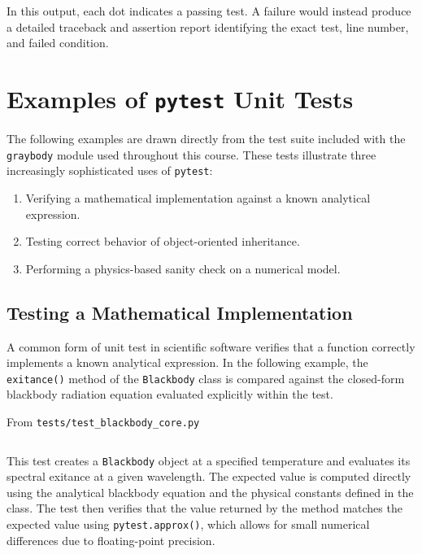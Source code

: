 In this output, each dot indicates a passing test. A failure would instead produce a detailed traceback and assertion report identifying the exact test, line number, and failed condition.

\section{Examples of \texttt{pytest} Unit Tests}

The following examples are drawn directly from the test suite included with the \texttt{graybody} module used throughout this course. These tests illustrate three increasingly sophisticated uses of \texttt{pytest}:

\begin{enumerate}
\item Verifying a mathematical implementation against a known analytical expression.
\item Testing correct behavior of object-oriented inheritance.
\item Performing a physics-based sanity check on a numerical model.
\end{enumerate}

\subsection{Testing a Mathematical Implementation}

A common form of unit test in scientific software verifies that a function correctly implements a known analytical expression. In the following example, the \texttt{exitance()} method of the \texttt{Blackbody} class is compared against the closed-form blackbody radiation equation evaluated explicitly within the test.

\vspace{0.5em}

From \texttt{tests/test\_blackbody\_core.py}
\inputminted[firstline=70,lastline=75]{python}{code/graybody/tests/test_blackbody_core.py}

\vspace{0.5em}

This test creates a \texttt{Blackbody} object at a specified temperature and evaluates its spectral exitance at a given wavelength. The expected value is computed directly using the analytical blackbody equation and the physical constants defined in the class. The test then verifies that the value returned by the method matches the expected value using \texttt{pytest.approx()}, which allows for small numerical differences due to floating-point precision.

